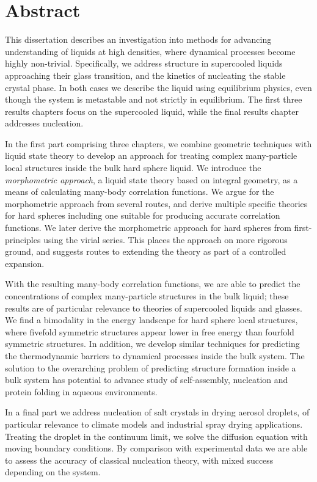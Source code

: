 \chapter*{Abstract}

This dissertation describes an investigation into methods for advancing understanding of liquids at high densities, where dynamical processes become highly non-trivial.
Specifically, we address structure in supercooled liquids approaching their glass transition, and the kinetics of nucleating the stable crystal phase.
In both cases we describe the liquid using equilibrium physics, even though the system is metastable and not strictly in equilibrium.
The first three results chapters focus on the supercooled liquid, while the final results chapter addresses nucleation.

In the first part comprising three chapters, we combine geometric techniques with liquid state theory to develop an approach for treating complex many-particle local structures inside the bulk hard sphere liquid.
We introduce the \emph{morphometric approach}, a liquid state theory based on integral geometry, as a means of calculating many-body correlation functions.
We argue for the morphometric approach from several routes, and derive multiple specific theories for hard spheres including one suitable for producing accurate correlation functions.
We later derive the morphometric approach for hard spheres from first-principles using the virial series.
This places the approach on more rigorous ground, and suggests routes to extending the theory as part of a controlled expansion.

With the resulting many-body correlation functions, we are able to predict the concentrations of complex many-particle structures in the bulk liquid; these results are of particular relevance to theories of supercooled liquids and glasses.
We find a bimodality in the energy landscape for hard sphere local structures, where fivefold symmetric structures appear lower in free energy than fourfold symmetric structures.
In addition, we develop similar techniques for predicting the thermodynamic barriers to dynamical processes inside the bulk system.
The solution to the overarching problem of predicting structure formation inside a bulk system has potential to advance study of self-assembly, nucleation and protein folding in aqueous environments.

In a final part we address nucleation of salt crystals in drying aerosol droplets, of particular relevance to climate models and industrial spray drying applications.
Treating the droplet in the continuum limit, we solve the diffusion equation with moving boundary conditions.
By comparison with experimental data we are able to assess the accuracy of classical nucleation theory, with mixed success depending on the system.

